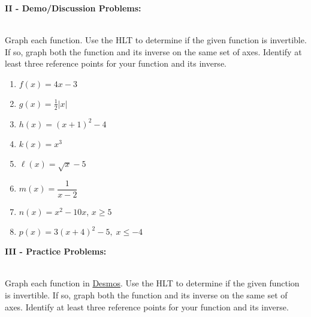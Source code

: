 \documentclass[12pt]{article}
\theoremstyle{definition}
\newcommand{\Desmos}{\href{https://www.desmos.com/}{Desmos}}
\begin{document}
\begin{center}
\end{center}
{\bf II - Demo/Discussion Problems:}\\
\ \par
Graph each function.  Use the HLT to determine if the given function is invertible.  If so, graph both the function and its inverse on the same set of axes.  Identify at least three reference points for your function and its inverse.
\begin{multicols}{2}
\begin{enumerate}
	\item $f(x)=4x-3$\\
	\item $g(x)=\frac{1}{2}|x|$\\
	\item $h(x)=(x+1)^2-4$\\
	\item $k(x)=x^3$
	\item $\ell(x)=\sqrt{x}-5$\\
	\item $m(x)=\dfrac{1}{x-2}$\\
	\item $n(x) = x^2 - 10x$, $x \geq 5$\\
	\item $p(x) = 3(x + 4)^{2} - 5, \; x \leq -4$
\end{enumerate}
\end{multicols}
{\bf III - Practice Problems:}\\
\ \par
Graph each function in \Desmos.  Use the HLT to determine if the given function is invertible.  If so, graph both the function and its inverse on the same set of axes.  Identify at least three reference points for your function and its inverse.
\end{document}

